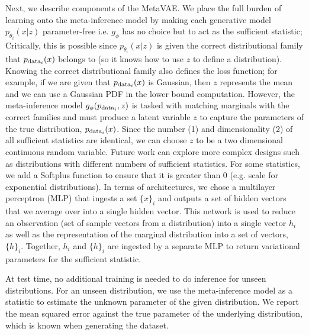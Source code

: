 Next, we describe components of the MetaVAE. We place the full burden of learning onto the meta-inference model by making each generative model $p_{\theta_i}(x|z)$ parameter-free i.e. $g_\phi$ has no choice but to act as the sufficient statistic; Critically, this is possible since $p_{\theta_i}(x|z)$ is given the correct distributional family that $p_{\textup{data}_i}(x)$ belongs to (so it knows how to use $z$ to define a distribution). Knowing the correct distributional family also defines the loss function; for example, if we are given that $p_{\textup{data}_i}(x)$ is Gaussian, then $z$ represents the mean and we can use a Gaussian PDF in the lower bound computation. However, the meta-inference model $g_\phi(p_{\textup{data}_i}, z)$ is tasked with matching marginals with the correct families and must produce a latent variable $z$ to capture the parameters of the true distribution, $p_{\textup{data}_i}(x)$. Since the number (1) and dimensionality (2) of all sufficient statistics are identical, we can choose $z$ to be a two dimensional continuous random variable. Future work can explore more complex designs such as distributions with different numbers of sufficient statistics. For some statistics, we add a Softplus function to ensure that it is greater than 0 (e.g. scale for exponential distributions). In terms of architectures, we chose a multilayer perceptron (MLP) that ingests a set $\{x\}_i$ and outputs a set of hidden vectors that we average over into a single hidden vector. This network is used to reduce an observation (set of sample vectors from a distribution) into a single vector $h_i$ as well as the representation of the marginal distribution into a set of vectors, $\{h\}_i$. Together, $h_i$ and $\{h\}_i$ are ingested by a separate MLP to return variational parameters for the sufficient statistic. 

At test time, no additional training is needed to do inference for unseen distributions. For an unseen distribution, we use the meta-inference model as a  statistic to estimate the unknown parameter of the given distribution. We report the mean squared error against the true parameter of the underlying distribution, which is known when generating the dataset.

